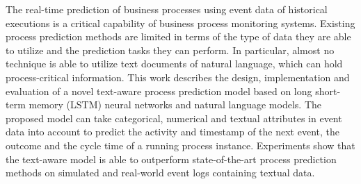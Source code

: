 The real-time prediction of business processes using event data of historical executions is a critical capability of business process monitoring systems.
Existing process prediction methods are limited in terms of the type of data they are able to utilize and the prediction tasks they can perform.
In particular, almost no technique is able to utilize text documents of natural language, which can hold process-critical information.
This work describes the design, implementation and evaluation of a novel text-aware process prediction model based on long short-term memory (LSTM) neural networks and natural language models.
The proposed model can take categorical, numerical and textual attributes in event data into account to predict the activity and timestamp of the next event, the outcome and the cycle time of a running process instance.
Experiments show that the text-aware model is able to outperform state-of-the-art process prediction methods on simulated and real-world event logs containing textual data.